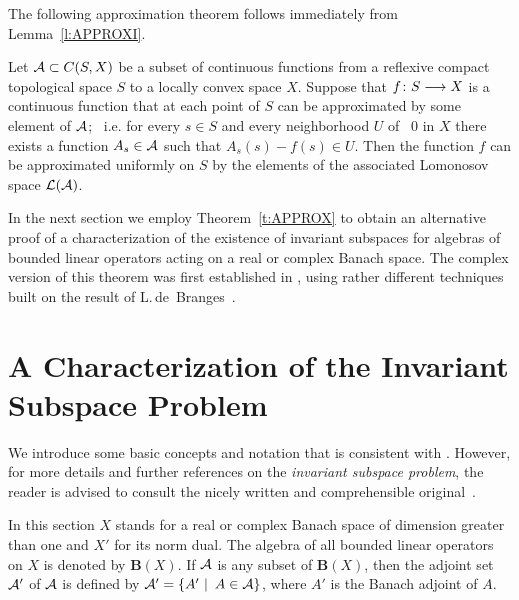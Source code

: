 \medskip
\goodbreak

The following approximation theorem follows immediately from
Lemma~\ref{l:APPROXI}.

\smallskip

\begin{thm}\label{t:APPROX}
Let ${\cal A} \subset C(S,X)$ be a subset of continuous functions
from a reflexive compact topological space $S$ to a locally
convex space $X$. Suppose that $f\colon S \longrightarrow X$ is a
continuous function that at each point of $S$ can be
approximated by some element of ${\cal A}$; \, i.e. for every
$s\in{S}$ and every neighborhood $U$ of \, $0$ in $X$ there
exists a function $A_s\in{\cal A}$ such that $A_s(s)-f(s)\in{U}$.
Then the function $f$ can be approximated uniformly on $S$ by
the elements of the associated Lomonosov space $\cal{L}({\cal A})$.
\end{thm}

\smallskip

In the next section we employ Theorem~\ref{t:APPROX} to obtain
an alternative proof of a characterization of the existence of
invariant subspaces for algebras of bounded linear operators
acting on a real or complex Banach space. The complex version
of this theorem was first established in \cite{AAB95}, using
rather different techniques built on the result of
L.\,de~Branges~\cite{dB93}.

\goodbreak

\def\baselinestretch{1.1}

\section{A Characterization of the Invariant Subspace Problem}

We introduce some basic concepts and notation that is
consistent with \cite{AAB95}. However, for more details and
further references on the {\em invariant subspace problem}, the
reader is advised to consult the nicely written and
comprehensible original~\cite{AAB95}.

\def\baselinestretch{1.66}
\medskip

In this section $X$ stands for a real or complex Banach space
of dimension greater than one and $X'$ for its norm dual. The
algebra of all bounded linear operators on $X$ is denoted by
$\mathbf{B}(X)$. If ${\cal A}$ is any subset of $\mathbf{B}(X)$, then
the adjoint set ${\cal A}'$ of ${\cal A}$ is defined by
${\cal A}'=\left\{A'\,\,|\,\,\, A\in{\cal A}\right\}$, where $A'$ is the Banach
adjoint of $A$.

